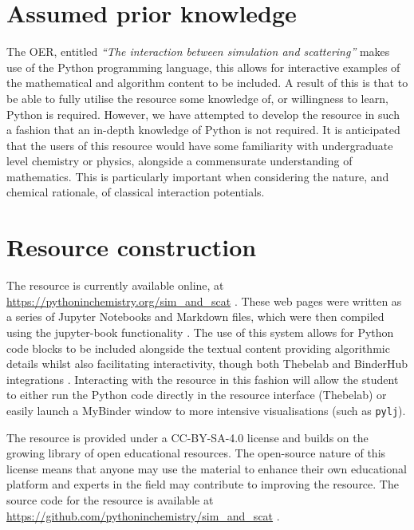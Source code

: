 \documentclass[amsmath,amssymb,twocolumn,superscriptaddress]{revtex4-1}
\begin{document}
\section{Assumed prior knowledge}

The OER, entitled \emph{``The interaction between simulation and scattering''} makes use of the Python programming language, this allows for interactive examples of the mathematical and algorithm content to be included.
A result of this is that to be able to fully utilise the resource some knowledge of, or willingness to learn, Python is required.
However, we have attempted to develop the resource in such a fashion that an in-depth knowledge of Python is not required.
It is anticipated that the users of this resource would have some familiarity with undergraduate level chemistry or physics, alongside a commensurate understanding of mathematics.
This is particularly important when considering the nature, and chemical rationale, of classical interaction potentials.

\section{Resource construction}

The resource is currently available online, at \url{https://pythoninchemistry.org/sim_and_scat} \cite{mccluskey_pythoninchemistry/sim_and_scat_2019}.
These web pages were written as a series of Jupyter Notebooks and Markdown files, which were then compiled using the jupyter-book functionality \cite{lau_jupyter/jupyter-book_2019}.
The use of this system allows for Python code blocks to be included alongside the textual content providing algorithmic details whilst also facilitating interactivity, though both Thebelab and BinderHub integrations \cite{ragan-kelley_minrk/thebelab_2019,ragan-kelley_jupyterhub/binderhub_2019,jupyter_binder_2018}.
Interacting with the resource in this fashion will allow the student to either run the Python code directly in the resource interface (Thebelab) or easily launch a MyBinder window to more intensive visualisations (such as \texttt{pylj}).

The resource is provided under a CC-BY-SA-4.0 license \cite{noauthor_creative_2019} and builds on the growing library of open educational resources.
The open-source nature of this license means that anyone may use the material to enhance their own educational platform and experts in the field may contribute to improving the resource.
The source code for the resource is available at \url{https://github.com/pythoninchemistry/sim_and_scat} \cite{mccluskey_pythoninchemistry/sim_and_scat_2019}.
\end{document}
